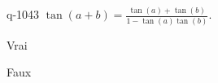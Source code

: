 \begin{truefalse}{q-1043}
$\tan(a+b)=\frac{\tan(a) + \tan(b)}{1-\tan(a)\tan(b)}$.
\item* Vrai
\item Faux
\end{truefalse}


